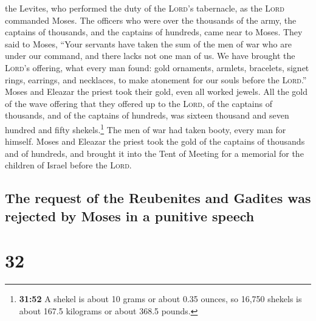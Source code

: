 the Levites, who performed the duty of the \textsc{Lord}'s tabernacle,
as the \textsc{Lord} commanded Moses.  The officers who
were over the thousands of the army, the captains of thousands, and the
captains of hundreds, came near to Moses.  They said to
Moses, ``Your servants have taken the sum of the men of war who are
under our command, and there lacks not one man of us.  We
have brought the \textsc{Lord}'s offering, what every man found: gold
ornaments, armlets, bracelets, signet rings, earrings, and necklaces, to
make atonement for our souls before the \textsc{Lord}.'' 
Moses and Eleazar the priest took their gold, even all worked jewels.
 All the gold of the wave offering that they offered up
to the \textsc{Lord}, of the captains of thousands, and of the captains
of hundreds, was sixteen thousand and seven hundred and fifty
shekels.\footnote{\textbf{31:52} A shekel is about 10 grams or about
  0.35 ounces, so 16,750 shekels is about 167.5 kilograms or about 368.5
  pounds.}  The men of war had taken booty, every man for
himself.  Moses and Eleazar the priest took the gold of
the captains of thousands and of hundreds, and brought it into the Tent
of Meeting for a memorial for the children of Israel before the
\textsc{Lord}.

\hypertarget{the-request-of-the-reubenites-and-gadites-was-rejected-by-moses-in-a-punitive-speech}{%
\subsection{The request of the Reubenites and Gadites was rejected by
Moses in a punitive
speech}\label{the-request-of-the-reubenites-and-gadites-was-rejected-by-moses-in-a-punitive-speech}}

\hypertarget{section-31}{%
\section{32}\label{section-31}}

